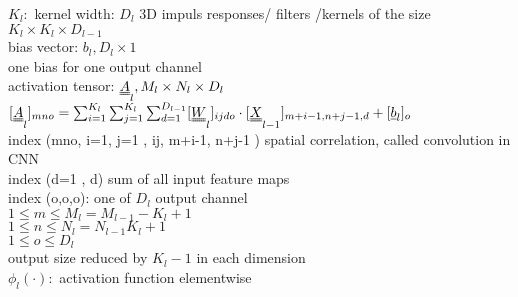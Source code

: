 $ K_l:  $ kernel width:
$ D_l  $ 3D impuls responses/ filters /kernels of the size $  K_l \times K_l \times D_{l-1} $\\
\textbullet bias vector: $  b_l , D_l \times 1  $ \\
one bias for one output channel\\
\textbullet activation tensor: $  \A_l , M_l \times N_l \times D_l  $\\
$ [\A _l ] _{mno} = \sum_{i=1 }^{K_l } \sum_{j=1}^{K_l} \sum_{d=1 }^{D_{l-1}} [\W_l ] _{ijdo} \cdot [\X_{l-1}]_{m+i-1 , n+j-1,d} + [\b_l ]_o$ \\
index (mno, i=1, j=1 , ij, m+i-1, n+j-1 ) spatial correlation, called convolution in CNN \\
index (d=1 , d) sum of all input feature maps\\
index (o,o,o): one of $ D_l  $ output channel\\
$  1 \leq m \leq M_l = M_{l-1 } - K_l + 1  $\\
$  1 \leq n \leq N_l = N_{l-1 } K_l +1  $\\
$  1 \leq o \leq D_l $ \\
 output size reduced by $  K_l -1  $ in each dimension \\
\textbullet $  \phi_l (\cdot):  $ activation function elementwise \\
